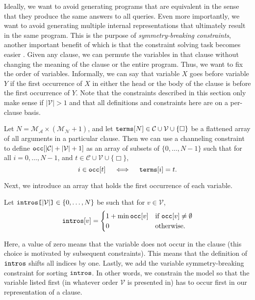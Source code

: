 \documentclass[runningheads]{llncs}
\newcommand{\variable}[1]{\texttt{\textup{#1}}}
\newcommand{\arrayd}[3]{\variable{{#1}[}{#2}\variable{]} \in {#3}}
\newcommand{\variables}{\mathcal{V}}
\newcommand{\constants}{\mathcal{C}}
\newcommand{\maxArity}{\mathcal{M}_{\mathcal{A}}}
\newcommand{\maxNumNodes}{\mathcal{M}_{\mathcal{N}}}
\begin{document}
Ideally, we want to avoid generating programs that are equivalent in the sense
that they produce the same answers to all queries. Even more importantly, we
want to avoid generating multiple internal representations that ultimately
result in the same program. This is the purpose of \emph{symmetry-breaking
  constraints}, another important benefit of which is that the constraint
solving task becomes easier \cite{DBLP:conf/cp/Walsh06}. Given any clause, we
can permute the variables in that clause without changing the meaning of the
clause or the entire program. Thus, we want to fix the order of variables.
Informally, we can say that variable $X$ goes before variable $Y$ if the first
occurrence of $X$ in either the head or the body of the clause is before the
first occurrence of $Y$. Note that the constraints described in this section
only make sense if $|\variables{}| > 1$ and that all definitions and constraints
here are on a per-clause basis.
\begin{definition}
  Let $N = \maxArity{} \times (\maxNumNodes{} + 1)$, and let
  $\variable{terms}[N] \in \constants{} \cup \variables{} \cup \{ \Box
  \}$ be a flattened array of all arguments in a particular clause. Then we can
  use a channeling constraint to define $\variable{occ}[|\constants{}| +
  |\variables{}| + 1]$ as an array of subsets of $\{ 0, \dots, N-1 \}$ such that
  for all $i = 0, \dots, N - 1$, and $t \in \constants{} \cup \variables{} \cup
  \{ \Box \}$,
  \[
    i \in \variable{occ}[t] \quad \iff \quad
    \variable{terms}[i] = t.
  \]
\end{definition}
Next, we introduce an array that holds the first occurrence of each variable.
\begin{definition}
  Let $\arrayd{intros}{|\variables{}|}{\{ 0, \dots, N \}}$ be such that
  for $v \in \variables{}$,
  \[
    \variable{intros}[v] = \begin{cases}
      1 + \min \variable{occ}[v] & \text{if }
      \variable{occ}[v] \ne \emptyset\\
      0 & \text{otherwise.}
    \end{cases}
  \]
\end{definition}
Here, a value of zero means that the variable does not occur in the clause (this
choice is motivated by subsequent constraints). This means that the definition
of $\variable{intros}$ shifts all indices by one. Lastly, we add the variable
symmetry-breaking constraint for sorting $\variable{intros}$. In other words, we
constrain the model so that the variable listed first (in whatever order
$\variables{}$ is presented in) has to occur first in our representation of a
clause.
\end{document}
